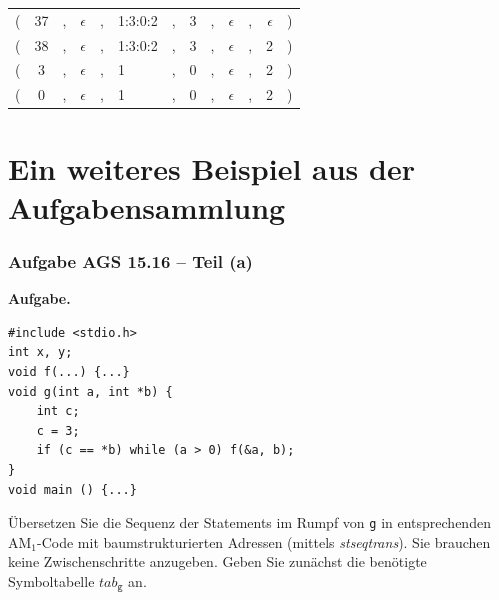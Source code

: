 \documentclass{beamer}
\begin{document}
\begin{frame}
\begin{center}
\begin{tabu}{rccrclcccrcrl}
			( & 37 &,& $\epsilon$ &,& 1:3:0:\phantom{4}2                       &,&  3 &,& $\epsilon$ &,& $\epsilon$ & ) \\
			( & 38 &,& $\epsilon$ &,& 1:3:0:\phantom{4}2                       &,&  3 &,& $\epsilon$ &,&          2 & ) \\
			( &  3 &,& $\epsilon$ &,& 1                              &,&  0 &,& $\epsilon$ &,&          2 & ) \\
			( &  0 &,& $\epsilon$ &,& 1                              &,&  0 &,& $\epsilon$ &,&          2 & ) \\
		\end{tabu}
	\end{center}
\end{frame}





\section{Ein weiteres Beispiel aus der Aufgabensammlung}

\begin{frame}[fragile] \frametitle{Aufgabe AGS 15.16 -- Teil (a)}
	\footnotesize
	\textbf{Aufgabe.}
	\begin{lstlisting}
#include <stdio.h>
int x, y;
void f(...) {...}
void g(int a, int *b) {
	int c;
	c = 3;
	if (c == *b) while (a > 0) f(&a, b);
}
void main () {...}
	\end{lstlisting}
	
	Übersetzen Sie die Sequenz der Statements im Rumpf von \texttt{g} in entsprechenden AM${}_\text{1}$-Code mit baumstrukturierten Adressen (mittels \textit{stseqtrans}). Sie brauchen keine Zwischenschritte anzugeben. Geben Sie zunächst die benötigte Symboltabelle $tab_{\texttt{g}}$ an.
\end{frame}
\end{document}
